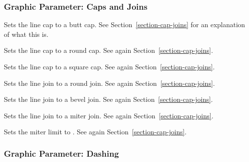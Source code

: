 \subsubsection{Graphic Parameter: Caps and Joins}

\begin{command}{\pgfsetbuttcap}
    Sets the line cap to a butt cap. See Section~\ref{section-cap-joins} for an
    explanation of what this is.
\end{command}
%
\begin{command}{\pgfsetroundcap}
    Sets the line cap to a round cap. See again Section~\ref{section-cap-joins}.
\end{command}
\begin{command}{\pgfsetrectcap}
    Sets the line cap to a square cap. See again Section~\ref{section-cap-joins}.
\end{command}
%
\begin{command}{\pgfsetroundjoin}
    Sets the line join to a round join. See again Section~\ref{section-cap-joins}.
\end{command}
%
\begin{command}{\pgfsetbeveljoin}
    Sets the line join to a bevel join. See again Section~\ref{section-cap-joins}.
\end{command}
%
\begin{command}{\pgfsetmiterjoin}
    Sets the line join to a miter join. See again Section~\ref{section-cap-joins}.
\end{command}
%
\begin{command}{\pgfsetmiterlimit{}}
    Sets the miter limit to  . See again
    Section~\ref{section-cap-joins}.
\end{command}


\subsubsection{Graphic Parameter: Dashing}

